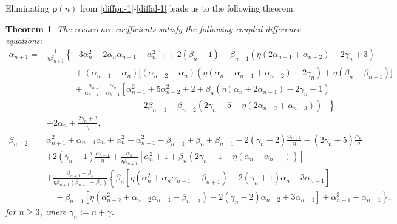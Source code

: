 \documentclass[11pt,a4paper]{article}
\newtheorem{theorem}{Theorem}[section]
\numberwithin{equation}{section}
\begin{document}
Eliminating $\textbf{p}(n)$ from \eqref{diffpn-1}-\eqref{diffal-1} leads us to the following theorem.
\begin{theorem}
The recurrence coefficients satisfy the following coupled difference equations:
\begin{equation}\label{diff-al}
\begin{aligned}
\alpha_{n+1}=&\frac{1}{\eta\beta_{n+1}}\left\{-3\alpha_{n}^2-2\alpha_{n}\alpha_{n-1}-\alpha_{n-1}^2+2(\beta_{n}-1)+\beta_{n-1}(\eta(2\alpha_{n-1}+\alpha_{n-2})-2\gamma_{n}+3)\right.\\
&\left.\qquad\quad\,+(\alpha_{n-1}-\alpha_{n})\big[(\alpha_{n-2}-\alpha_{n})\left(\eta(\alpha_{n}+\alpha_{n-1}+\alpha_{n-2})-2\gamma_n\right)+\eta(\beta_n-\beta_{n-1})\big]\right.\\
&\left.\qquad\quad\,+\frac{\alpha_{n-1}-\alpha_{n}}{\alpha_{n-2}-\alpha_{n-1}}\left[\alpha_{n-1}^2+5\alpha_{n-2}^2+2+\beta_{n}\left(\eta(\alpha_{n}+2\alpha_{n-1})-2\gamma_{n}-1\right)\right.\right.\\
&\left.\left.\quad\qquad\qquad\qquad\qquad\quad\,-2\beta_{n-1}+\beta_{n-2}\left(2\gamma_{n}-5-\eta(2\alpha_{n-2}+\alpha_{n-3})\right)\right]\right\}\\
&-2\alpha_{n}+\frac{2\gamma_{n}+3}{\eta},
\end{aligned}
\end{equation}
\begin{equation}\label{diff-bt}
	\begin{aligned}
\beta_{n+2}=&\alpha_{n+1}^2+\alpha_{n+1}\alpha_n+\alpha_{n}^2-\alpha_{n-1}^2-\beta_{n+1}+\beta_n+\beta_{n-1}-2(\gamma_{n}+2)\frac{\alpha_{n+1}}{\eta}-(2\gamma_{n}+5)\frac{\alpha_{n}}{\eta}\\
&+2(\gamma_n-1)\frac{\alpha_{n-1}}{\eta}+\frac{\alpha_{n}}{\eta\beta_{n+1}}\left[\alpha_n^2+1+\beta_{n}\left(2\gamma_{n}-1-\eta(\alpha_{n}+\alpha_{n-1})\right)\right]\\
&+\frac{\beta_{n+1}-\beta_{n}}{\eta\beta_{n+1}(\beta_{n-1}-\beta_{n})}\left\{\beta_{n}\left[\eta(\alpha_{n}^2+\alpha_n\alpha_{n-1}-\beta_{n+1})-2(\gamma_{n}+1)\alpha_{n}-3\alpha_{n-1}\right]\right.\\ &\left.\quad-\beta_{n-1}\left[\eta(\alpha_{n-2}^2+\alpha_{n-2}\alpha_{n-1}-\beta_{n-2})-2(\gamma_{n}-2)\alpha_{n-2}+3\alpha_{n-1}\right]+\alpha_{n-1}^3+\alpha_{n-1}\right\},
	\end{aligned}
\end{equation}
for $n\geq3$, where $\gamma_{n}:=n+\gamma$.
	\end{theorem}
\end{document}
